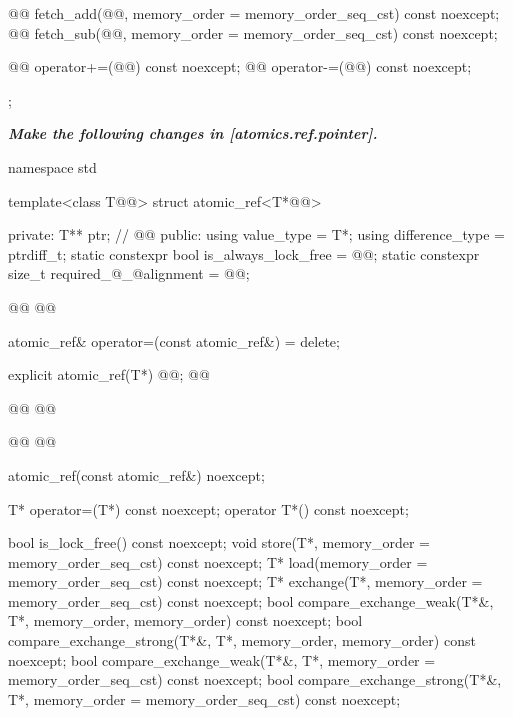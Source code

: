 \begin{codeblock}
{{    @@ fetch_add(@@,
                             memory_order = memory_order_seq_cst) const noexcept;
    @@ fetch_sub(@@,
                             memory_order = memory_order_seq_cst) const noexcept;

    @@ operator+=(@@) const noexcept;
    @@ operator-=(@@) const noexcept;
  };
}
\end{codeblock}

\textbf{\textit{Make the following changes in [atomics.ref.pointer].}} \\

\begin{codeblock}
namespace std {
  template<class T@@> struct atomic_ref<T*@@> {
  private:
    T** ptr;              // \expos
    @@
  public:
    using value_type = T*;
    using difference_type = ptrdiff_t;
    static constexpr bool is_always_lock_free = @@;
    static constexpr size_t required_@_@alignment = @@;

    @@
    @@

    atomic_ref& operator=(const atomic_ref&) = delete;

    explicit atomic_ref(T*) @@;
    @@
   
    @@
    @@
    
    @@
    @@

    atomic_ref(const atomic_ref&) noexcept;

    T* operator=(T*) const noexcept;
    operator T*() const noexcept;

    bool is_lock_free() const noexcept;
    void store(T*, memory_order = memory_order_seq_cst) const noexcept;
    T* load(memory_order = memory_order_seq_cst) const noexcept;
    T* exchange(T*, memory_order = memory_order_seq_cst) const noexcept;
    bool compare_exchange_weak(T*&, T*,
                               memory_order, memory_order) const noexcept;
    bool compare_exchange_strong(T*&, T*,
                                 memory_order, memory_order) const noexcept;
    bool compare_exchange_weak(T*&, T*,
                               memory_order = memory_order_seq_cst) const noexcept;
    bool compare_exchange_strong(T*&, T*,
                                 memory_order = memory_order_seq_cst) const noexcept;

}}
\end{codeblock}
